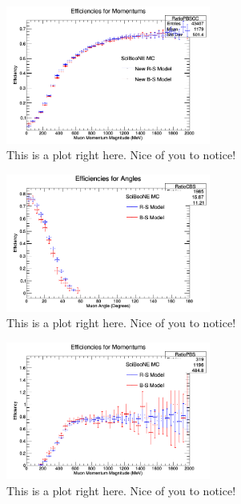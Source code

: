 \documentclass[11pt]{article}
\begin{document}
\begin{figure}[H]
\centering
\includegraphics[width=0.6\textwidth]{ANMCombinedPlotsImages/16-ANMCombinedPlots.png}
\caption{This is a plot right here. Nice of you to notice!}
\end{figure}

\begin{figure}[H]
\centering
\includegraphics[width=0.6\textwidth]{ANMCombinedPlotsImages/17-ANMCombinedPlots.png}
\caption{This is a plot right here. Nice of you to notice!}
\end{figure}

\begin{figure}[H]
\centering
\includegraphics[width=0.6\textwidth]{ANMCombinedPlotsImages/18-ANMCombinedPlots.png}
\caption{This is a plot right here. Nice of you to notice!}
\end{figure}

\end{document}
